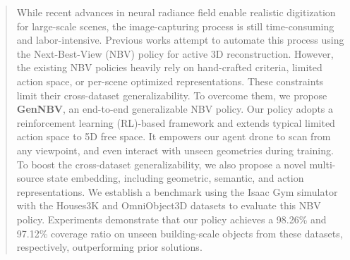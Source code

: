 
\begin{abstract}
    \vspace{-0.2cm}
    While recent advances in neural radiance field enable realistic digitization for large-scale scenes, the image-capturing process is still time-consuming and labor-intensive.
    Previous works attempt to automate this process using the Next-Best-View (NBV) policy for active 3D reconstruction.
    However, the existing NBV policies heavily rely on hand-crafted criteria, limited action space, or per-scene optimized representations. These constraints limit their cross-dataset generalizability.
    To overcome them, we propose \textbf{GenNBV}, an end-to-end generalizable NBV policy. Our policy adopts a reinforcement learning (RL)-based framework and extends typical limited action space to 5D free space. It empowers our agent drone to scan from any viewpoint, and even interact with unseen geometries during training.
    To boost the cross-dataset generalizability, we also propose a novel multi-source state embedding, including geometric, semantic, and action representations.
    We establish a benchmark using the Isaac Gym simulator with the Houses3K and OmniObject3D datasets to evaluate this NBV policy.
    Experiments demonstrate that our policy achieves a 98.26\% and 97.12\% coverage ratio on unseen building-scale objects from these datasets, respectively, outperforming prior solutions.

\end{abstract}